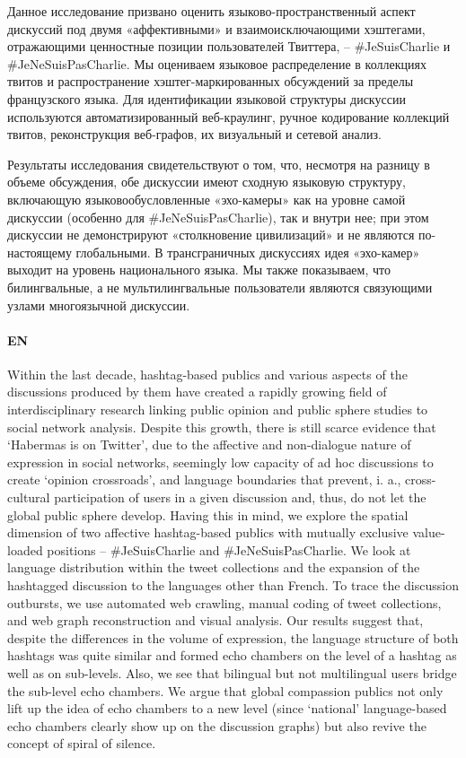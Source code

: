 Данное исследование призвано оценить языково-пространственный аспект дискуссий под двумя «аффективными» и  взаимоисключающими хэштегами, отражающими ценностные позиции пользователей Твиттера, -- \#JeSuisCharlie и \#JeNeSuisPasCharlie. Мы оцениваем языковое распределение в коллекциях твитов и распространение хэштег-маркированных обсуждений за пределы французского языка. Для идентификации языковой структуры дискуссии используются автоматизированный веб-краулинг, ручное кодирование коллекций твитов, реконструкция веб-графов, их визуальный и сетевой анализ.

Результаты исследования свидетельствуют о  том, что, несмотря на  разницу в  объеме обсуждения, обе дискуссии имеют сходную языковую структуру, включающую языковообусловленные «эхо-камеры» как на уровне самой дискуссии (особенно для \#JeNeSuisPasCharlie), так и внутри нее; при этом дискуссии не демонстрируют «столкновение цивилизаций» и не являются по-настоящему глобальными. В трансграничных дискуссиях идея «эхо-камер» выходит на уровень национального языка. Мы также показываем, что билингвальные, а не мультилингвальные пользователи являются связующими узлами многоязычной дискуссии.

\paragraph{EN} Within the last decade, hashtag-based publics and various aspects of the discussions produced by them have created a rapidly growing field of interdisciplinary research linking public opinion and public sphere studies to social network analysis. Despite this growth, there is still scarce evidence that ‘Habermas is on Twitter’, due to the affective and non-dialogue nature of expression in social networks, seemingly low capacity of ad hoc discussions to create ‘opinion crossroads’, and language boundaries that prevent, i. a., cross-cultural participation of users in a given discussion and, thus, do not let the global public sphere develop. Having this in mind, we explore the spatial dimension of two affective hashtag-based publics with mutually exclusive value-loaded positions -- \#JeSuisCharlie and \#JeNeSuisPasCharlie. We look at language distribution within the tweet collections and the expansion of the hashtagged discussion to the languages other than French. To trace the discussion outbursts, we use automated web crawling, manual coding of tweet collections, and web graph reconstruction and visual analysis. Our results suggest that, despite the differences in the volume of expression, the language structure of both hashtags was quite similar and formed echo chambers on the level of a hashtag as well as on sub-levels. Also, we see that bilingual but not multilingual users bridge the sub-level echo chambers. We argue that global compassion publics not only lift up the idea of echo chambers to a new level (since ‘national’ language-based echo chambers clearly show up on the discussion graphs) but also revive the concept of spiral of silence.

